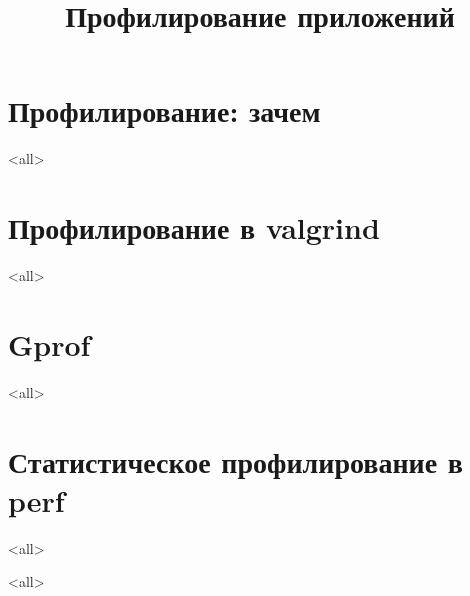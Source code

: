 

\title[Profiling]{Профилирование приложений}





\begin{frame}
	\frametitle{}
	\titlepage
	\vspace{-0.5cm}
	\begin{center}
	\end{center}
\end{frame}

\begin{frame}
	\tableofcontents
\end{frame}




\section{Профилирование: зачем}
\mode<all>{}

\section{Профилирование в valgrind}
\mode<all>{}

\section{Gprof}
\mode<all>{}

\section[oprofile]{Статистическое профилирование в perf}
\mode<all>{}

\mode<all>

